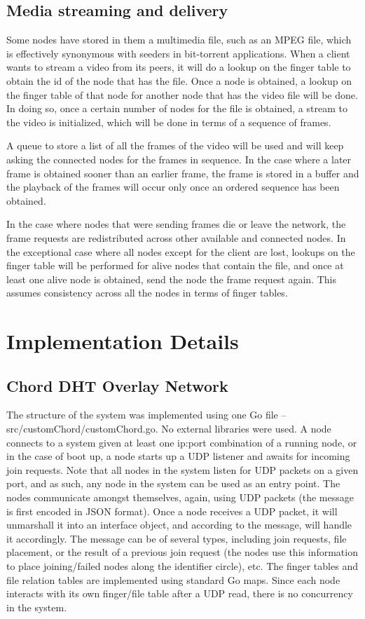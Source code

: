 \documentclass[fleqn,24pt]{SelfArx} %
\begin{document}
\subsection{Media streaming and delivery}

Some nodes have stored in them a multimedia file, such as an MPEG file, which is effectively synonymous with seeders in bit-torrent applications. When a client wants to stream a video from its peers, it will do a lookup on the finger table to obtain the id of the node that has the file. Once a node is obtained, a lookup on the finger table of that node for another node that has the video file will be done. In doing so, once a certain number of nodes for the file is obtained, a stream to the video is initialized, which will be done in terms of a sequence of frames. 

A queue to store a list of all the frames of the video will be used and will keep asking the connected nodes for the frames in sequence. In the case where a later frame is obtained sooner than an earlier frame, the frame is stored in a buffer and the playback of the frames will occur only once an ordered sequence has been obtained. 

In the case where nodes that were sending frames die or leave the network, the frame requests are redistributed across other available and connected nodes. In the exceptional case where all nodes except for the client are lost, lookups on the finger table will be performed for alive nodes that contain the file, and once at least one alive node is obtained, send the node the frame request again. This assumes consistency across all the nodes in terms of finger tables.

\section{Implementation Details}

\subsection{Chord DHT Overlay Network}

The structure of the system was implemented using one Go file -- src/customChord/customChord.go. No external libraries were used. A node connects to a system given at least one ip:port combination of a running node, or in the case of boot up, a node starts up a UDP listener and awaits for incoming join requests. Note that all nodes in the system listen for UDP packets on a given port, and as such, any node in the system can be used as an entry point. The nodes communicate amongst themselves, again, using UDP packets (the message is first encoded in JSON format). Once a node receives a UDP packet, it will unmarshall it into an interface object, and according to the message, will handle it accordingly. The message can be of several types, including join requests, file placement, or the result of a previous join request (the nodes use this information to place joining/failed nodes along the identifier circle), etc. The finger tables and file relation tables are implemented using standard Go maps. Since each node interacts with its own finger/file table after a UDP read, there is no concurrency in the system.
\end{document}
